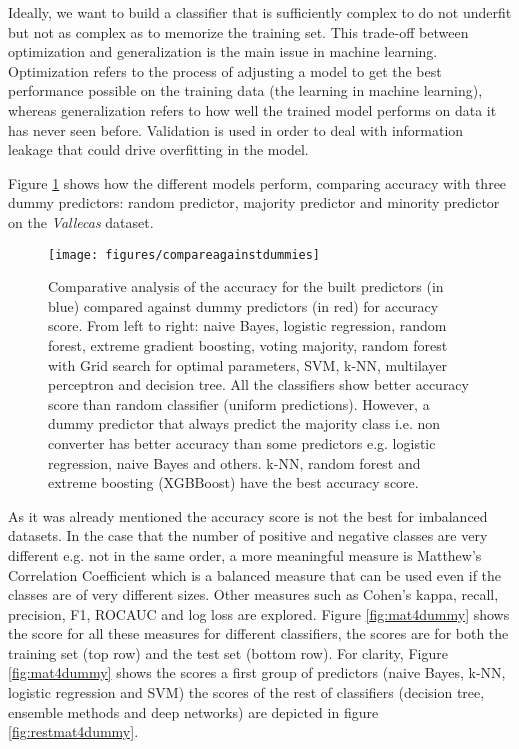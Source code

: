 \documentclass[11pt]{article}
\theoremstyle{definition}
\theoremstyle{remark}
\begin{document}
Ideally, we want to build a classifier that is sufficiently complex to do not underfit but not as complex as to memorize the training set. This trade-off between optimization and generalization is the main issue in machine learning. Optimization refers to the process of adjusting a model to get the best performance possible on the training data (the learning in machine learning), whereas generalization refers to how well the trained model performs on data it has never seen before. Validation is used in order to deal with information leakage that could drive overfitting in the model.


Figure \ref{fig:dummies} shows how the different models perform, comparing accuracy with three dummy predictors: random predictor, majority predictor and minority predictor on the \emph{Vallecas} dataset. 
\begin{figure}[H] 
        \centering
        \texttt{[image: figures/compareagainstdummies]}
        \caption{Comparative analysis of the accuracy for the built predictors (in blue) compared against dummy predictors (in red) for accuracy score. From left to right: naive Bayes, logistic regression, random forest, extreme gradient boosting, voting majority, random forest with Grid search for optimal parameters, SVM, k-NN, multilayer perceptron and decision tree. All the classifiers show better accuracy score than random classifier (uniform predictions). However, a dummy predictor that always predict the majority class i.e. non converter has better accuracy than some predictors e.g. logistic regression, naive Bayes and others. k-NN, random forest and extreme boosting (XGBBoost) have the best accuracy score.
        } \label{fig:dummies}
\end{figure}


As it was already mentioned the accuracy score is not the best for imbalanced datasets. In the case that the number of positive and negative classes are very different e.g. not in the same order, a more meaningful measure is Matthew’s Correlation Coefficient which is a balanced measure that can be used even if the classes are of very different sizes. Other measures such as Cohen's kappa, recall, precision, F1, ROCAUC and log loss are explored. Figure \ref{fig:mat4dummy} shows the score for all these measures for different classifiers, the scores are for both the training set (top row) and the test set (bottom row). For clarity, Figure \ref{fig:mat4dummy} shows the scores a first group of predictors (naive Bayes, k-NN, logistic regression and SVM) the scores of the rest of classifiers (decision tree, ensemble methods and deep networks) are depicted in figure \ref{fig:restmat4dummy}.
\end{document}
